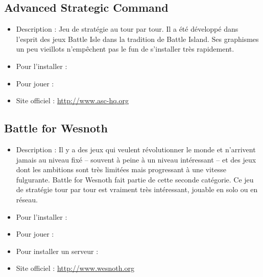 \subsection{Advanced Strategic Command}
\begin{itemize}
\begingroup
{}
\item Description : Jeu de stratégie au tour par tour. Il a été développé dans l'esprit des jeux Battle Isle dans la tradition de Battle Island. Ses graphismes un peu vieillots n'empêchent pas le fun de s'installer très rapidement.{\par}
\item Pour l'installer : 
\item Pour jouer : 
\item Site officiel : \url{http://www.asc-hq.org}{\par}
\endgroup
\end{itemize}
\subsection{Battle for Wesnoth}
\begin{itemize}
\begingroup
{}
\item Description : Il y a des jeux qui veulent révolutionner le monde et n'arrivent jamais au niveau fixé -- souvent à peine à un niveau intéressant -- et des jeux dont les ambitions sont très limitées mais progressant à une vitesse fulgurante. Battle for Wesnoth fait partie de cette seconde catégorie. Ce jeu de stratégie tour par tour est vraiment très intéressant, jouable en solo ou en réseau.{\par}
\endgroup
\item Pour l'installer : 
\item Pour jouer : 
\item Pour installer un serveur : 
\item Site officiel : \url{http://www.wesnoth.org}{\par}
\end{itemize}
